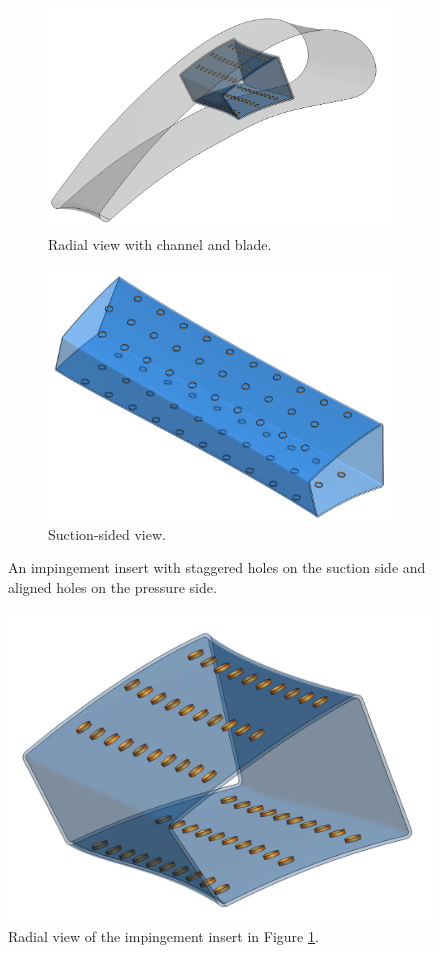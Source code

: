 \documentclass[a4paper, 11pt]{report}
\theoremstyle{definition}
\begin{document}
	\begin{figure}[H]
		\centering
		\begin{subfigure}{.37\textwidth}
			\includegraphics[width=\textwidth]{../tec/impingement/00.png}
			\caption{Radial view with channel and blade.}
		\end{subfigure}
		\begin{subfigure}{.37\textwidth}
			\includegraphics[width=\textwidth]{../tec/impingement/02.png}
			\caption{Suction-sided view.}
		\end{subfigure}
		\caption{An impingement insert with staggered holes on the suction side and aligned holes on the pressure side.}
		\label{fig:impingementinsert}
	\end{figure}

	\begin{figure}[H]
		\centering
		\includegraphics[width=.5\textwidth]{../tec/impingement/01.png}
		\caption{Radial view of the impingement insert in Figure \ref{fig:impingementinsert}.}
		\label{fig:impingementinsert_radial}
	\end{figure}
\end{document}

